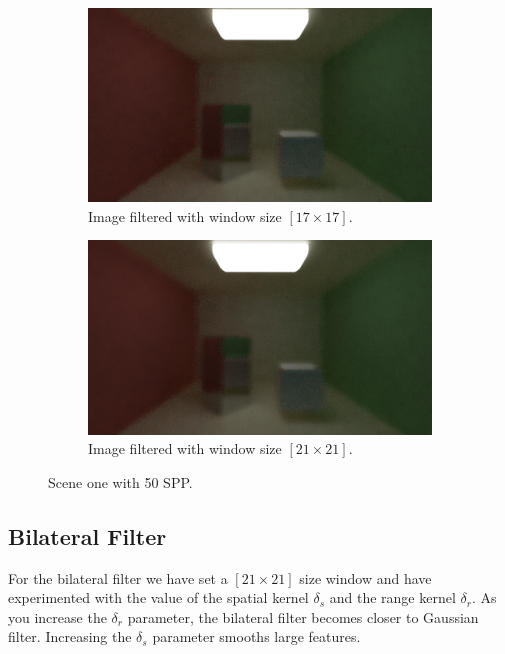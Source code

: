 \documentclass[titlepage,12pt]{report}
\begin{document}
\begin{figure}[H]
	\begin{subfigure}{.48\textwidth}
		\centering
		\includegraphics[scale=0.2]{media/median/cornell_normal_50_median_filter_17.png}
		\caption{Image filtered with window size $[17 \times 17]$.}
		\label{median_filter_7}
	\end{subfigure}
	\begin{subfigure}{.48\textwidth}
		\centering
		\includegraphics[scale=0.2]{media/median/cornell_normal_50_median_filter_21.png}
		\caption{Image filtered with window size $[21 \times 21]$.}
		\label{median_filter_8}
	\end{subfigure}
	\medskip
	\caption{Scene one with 50 SPP.}
	\label{median_filter_02}
\end{figure}

\subsection{Bilateral Filter}

For the bilateral filter we have set a $[21 \times 21]$ size window and have experimented with the value of the spatial kernel $\delta_s$ and the range kernel $\delta_r$. As you increase the $\delta_r$ parameter, the bilateral filter becomes closer to Gaussian filter. Increasing the $\delta_s$ parameter smooths large features.
\end{document}
